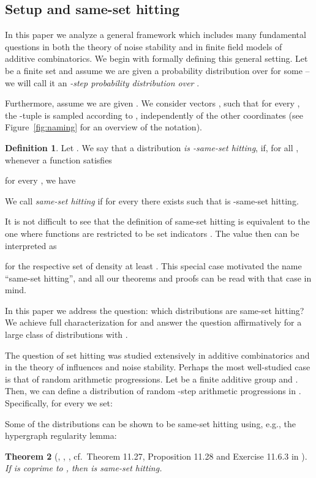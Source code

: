 \documentclass{daj}
\newcommand{\1}{\mathbbm{1}}
\theoremstyle{plain}
\newtheorem{theorem}{Theorem}[section]
\theoremstyle{definition}
\newtheorem{definition}[theorem]{Definition}
\begin{document}
\subsection{Setup and same-set hitting} 
In this paper we analyze a general framework which includes many fundamental
questions in both
the theory of noise stability and in finite field models of additive combinatorics. 
We begin with formally defining this general setting. 
Let  be a finite set  
and assume we are given a probability distribution 
over 
for some  -- we will call it an
\emph{-step probability distribution over }.

Furthermore, assume we are given .
We consider  vectors ,
 such that 
for every , the -tuple  
is sampled according to , independently of the other
coordinates 
(see Figure~\ref{fig:naming} for an overview of the notation). 

\begin{definition}
\label{def:same-hitting}
Let . We say that a distribution
\emph{ is -same-set hitting},
if, for all , whenever a function  satisfies

for every ,
we have


We call  \emph{same-set hitting} if for every 
 there exists  such that
 is -same-set hitting.
\end{definition}

It is not difficult to see that the definition
of same-set hitting is equivalent to the one where functions 
are restricted to be set indicators .
The value 
then can be interpreted as 

for the respective set  of density
at least . This special case motivated the name ``same-set hitting'',
and all our theorems and proofs can be read with that case
in mind.

In this paper we address the question: which distributions 
are same-set hitting? We achieve full characterization for 
and answer the question affirmatively for a large class of distributions
with .

The question of set hitting was studied extensively in additive combinatorics and in the theory of influences and noise stability. Perhaps the most well-studied case is that of random arithmetic progressions. Let  be a finite additive group
and .
Then, we can define a distribution  
of random -step arithmetic progressions in . 
Specifically, for every  we set:


Some of the distributions  can be shown to be
same-set hitting using, e.g., the hypergraph regularity lemma:
\begin{theorem}[\cite{RS04}, \cite{RS06}, \cite{Gow07}, cf.~Theorem 11.27,
Proposition 11.28 and Exercise 11.6.3 in \cite{TV06}]
\label{thm:progressions}
If  is coprime to , then  is same-set hitting.
\end{theorem}
\end{document}
